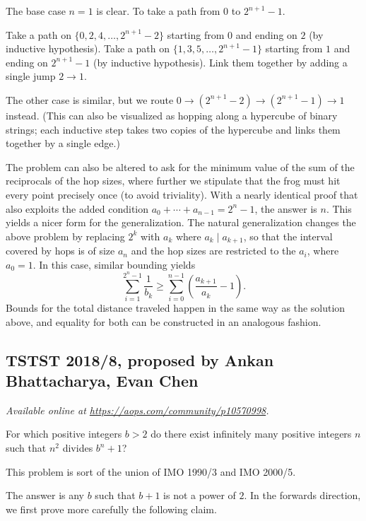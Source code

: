 \documentclass[11pt]{scrartcl}
\begin{document}
The base case $n = 1$ is clear.
To take a path from $0$ to $2^{n+1}-1$.
\begin{itemize}
  \ii Take a path on $\{0, 2, 4, \dots, 2^{n+1} - 2\}$
  starting from $0$ and ending on $2$ (by inductive hypothesis).
  \ii Take a path on $\{1, 3, 5, \dots, 2^{n+1} - 1\}$
  starting from $1$ and ending on $2^{n+1}-1$ (by inductive hypothesis).
  \ii Link them together by adding a single jump $2 \to 1$.
\end{itemize}
The other case is similar, but we route $0 \to (2^{n+1}-2) \to (2^{n+1}-1) \to 1$ instead.
(This can also be visualized as hopping along a hypercube of binary strings;
each inductive step takes two copies of the hypercube
and links them together by a single edge.)

\begin{remark*}
  The problem can also be altered to ask for the minimum value of the sum of the reciprocals of the hop sizes, where further we stipulate that the frog must hit every point precisely once (to avoid triviality). With a nearly identical proof that also exploits the added condition $a_0 + \dotsb + a_{n - 1} = 2^n - 1$, the answer is $n$. This yields a nicer form for the generalization. The natural generalization changes the above problem by replacing $2^k$ with $a_k$ where $a_k \mid a_{k + 1}$, so that the interval covered by hops is of size $a_n$ and the hop sizes are restricted to the $a_i$, where $a_0 = 1$. In this case, similar bounding yields
\[\sum_{i = 1}^{2^n - 1}\frac{1}{b_k}\ge\sum_{i = 0}^{n - 1}\left(\frac{a_{k + 1}}{a_k} - 1\right).\]
Bounds for the total distance traveled happen in the same way as the solution above, and equality for both can be constructed in an analogous fashion.
\end{remark*}
\pagebreak

\subsection{TSTST 2018/8, proposed by Ankan Bhattacharya, Evan Chen}
\textsl{Available online at \url{https://aops.com/community/p10570998}.}
\begin{mdframed}[style=mdpurplebox,frametitle={Problem statement}]
For which positive integers $b > 2$ do there exist
infinitely many positive integers $n$
such that $n^2$ divides $b^n+1$?
\end{mdframed}
This problem is sort of the union of IMO 1990/3 and IMO 2000/5.

The answer is any $b$ such that $b+1$ is not a power of $2$.
In the forwards direction, we first prove more carefully the
following claim.
\end{document}
